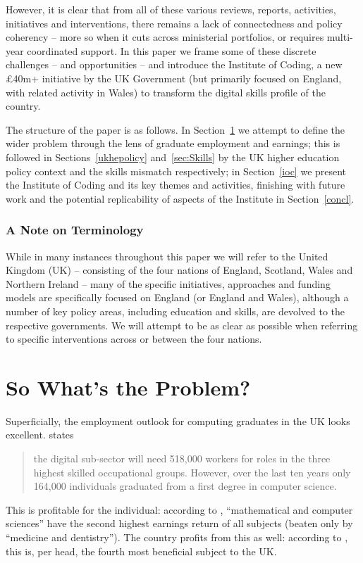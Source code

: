 \documentclass[sigconf,anonymous]{acmart}
\begin{document}
However, it is clear that from all of these various reviews, reports,
activities, initiatives and interventions, there remains a lack of
connectedness and policy coherency -- more so when it cuts across
ministerial portfolios, or requires multi-year coordinated support. In
this paper we frame some of these discrete challenges -- and
opportunities -- and introduce the Institute of Coding, a new
\pounds40m+ initiative by the UK Government (but primarily focused on
England, with related activity in Wales) to transform the digital
skills profile of the country.

The structure of the paper is as follows. In Section~\ref{problem} we
attempt to define the wider problem through the lens of graduate
employment and earnings; this is followed in Sections~\ref{ukhepolicy}
and~\ref{sec:Skills} by the UK higher education policy context and the
skills mismatch respectively; in Section~\ref{ioc} we present the
Institute of Coding and its key themes and activities, finishing with
future work and the potential replicability of aspects of
the Institute in Section~\ref{concl}.


\subsubsection*{A Note on Terminology}

While in many instances throughout this paper we will refer to the
United Kingdom (UK) -- consisting of the four nations of England,
Scotland, Wales and Northern Ireland -- many of the specific
initiatives, approaches and funding models are specifically focused on
England (or England and Wales), although a number of key policy areas,
including education and skills, are devolved to the respective
governments. We will attempt to be as clear as possible when referring
to specific interventions across or between the four nations.

\section{So What's the Problem?}\label{problem}

Superficially, the employment outlook for computing graduates in the
UK looks excellent. \cite[p.~74]{UKCES2015b} states
\begin{quote} the digital sub-sector will need 518,000 workers for
roles in the three highest skilled occupational groups. However, over
the last ten years only 164,000 individuals graduated from a first
degree in computer science.
\end{quote} This is profitable for the individual: according to
\cite[Figure 4]{BIS2011a}, ``mathematical and computer sciences'' have
the second highest earnings return of all subjects (beaten only by
``medicine and dentistry'').  The country profits from this as well:
according to \cite[p.~16]{BIS2011a}, this is, per head, the fourth
most beneficial subject to the UK.
\end{document}
